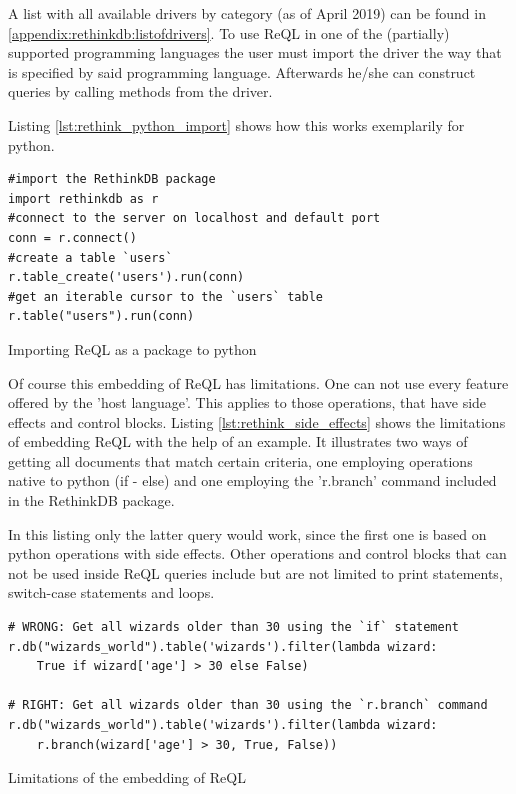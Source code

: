 A list with all available drivers by category (as of April 2019) can be found in \autoref{appendix:rethinkdb:listofdrivers}.
To use ReQL in one of the (partially) supported programming languages the user must import the driver the way that is specified by said programming language. Afterwards he/she can construct queries by calling methods from the driver.


Listing \autoref{lst:rethink_python_import} shows how this works exemplarily for python. 

\begin{listing}[ht]
\begin{verbatim}
#import the RethinkDB package
import rethinkdb as r  
#connect to the server on localhost and default port
conn = r.connect()       
#create a table `users`
r.table_create('users').run(conn)  
#get an iterable cursor to the `users` table
r.table("users").run(conn)          
\end{verbatim}
\caption{Importing ReQL as a package to python}
\label{lst:rethink_python_import}
\end{listing}

 Of course this embedding of ReQL has limitations. One can not use every feature offered by the 'host language'. This applies to those operations, that have side effects and control blocks. Listing \autoref{lst:rethink_side_effects} shows the limitations of embedding ReQL with the help of an example. It illustrates two ways of getting all documents that match certain criteria, one employing operations native to python (if - else) and one employing the 'r.branch' command included in the RethinkDB package.


In this listing only the latter query would work, since the first one is based on python operations with side effects. Other operations and control blocks that can not be used inside ReQL queries include but are not limited to print statements, switch-case statements and loops.

\begin{listing}[ht]
\begin{verbatim}
# WRONG: Get all wizards older than 30 using the `if` statement
r.db("wizards_world").table('wizards').filter(lambda wizard:
    True if wizard['age'] > 30 else False)

# RIGHT: Get all wizards older than 30 using the `r.branch` command
r.db("wizards_world").table('wizards').filter(lambda wizard:
    r.branch(wizard['age'] > 30, True, False))
\end{verbatim}
\caption{Limitations of the embedding of ReQL}
\label{lst:rethink_side_effects}
\end{listing}


